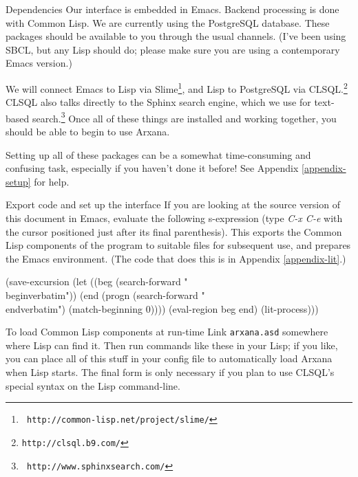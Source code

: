 \begin{notate}{Dependencies} \label{dependencies}
Our interface is embedded in Emacs.  Backend processing is
done with Common Lisp.  We are currently using the
PostgreSQL database.  These packages should be available
to you through the usual channels.  (I've been using SBCL,
but any Lisp should do; please make sure you are using a
contemporary Emacs version.)

We will connect Emacs to Lisp via Slime\footnote{{\tt
    http://common-lisp.net/project/slime/}}, and Lisp to
PostgreSQL via CLSQL.\footnote{{\tt http://clsql.b9.com/}}
CLSQL also talks directly to the Sphinx search engine,
which we use for text-based search.\footnote{{\tt
    http://www.sphinxsearch.com/}} Once all of these
things are installed and working together, you should be
able to begin to use Arxana.

Setting up all of these packages can be a somewhat
time-consuming and confusing task, especially if you
haven't done it before!  See Appendix \ref{appendix-setup}
for help.
\end{notate}

\begin{notate}{Export code and set up the interface}
If you are looking at the source version of this document
in Emacs, evaluate the following s-expression (type
\emph{C-x C-e} with the cursor positioned just after its
final parenthesis).  This exports the Common Lisp
components of the program to suitable files for subsequent
use, and prepares the Emacs environment.  (The code that
does this is in Appendix \ref{appendix-lit}.)
\end{notate}

\begin{idea}
(save-excursion
  (let ((beg (search-forward "\\begin{verbatim}"))
        (end (progn (search-forward "\\end{verbatim}")
                    (match-beginning 0))))
    (eval-region beg end)
    (lit-process)))
\end{idea}

\begin{notate}{To load Common Lisp components at run-time} \label{load-at-runtime}
Link {\tt arxana.asd} somewhere where Lisp can find it.
Then run commands like these in your Lisp; if you like,
you can place all of this stuff in your config file to
automatically load Arxana when Lisp starts.  The final
form is only necessary if you plan to use CLSQL's special
syntax on the Lisp command-line.
\end{notate}

